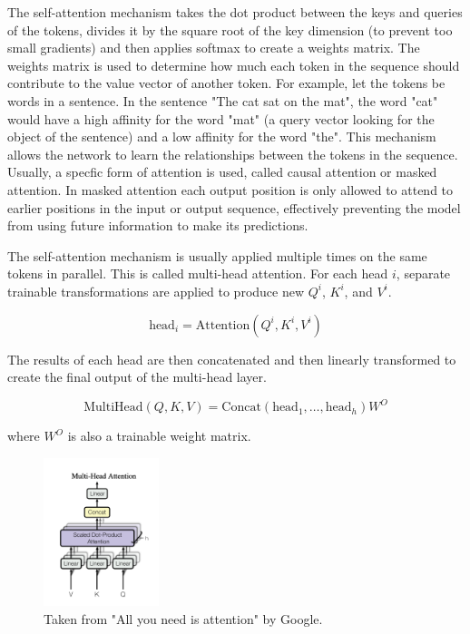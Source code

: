 \documentclass[11pt]{article}
\begin{document}
The self-attention mechanism takes the dot product between the keys and queries of the tokens, divides it by the square root of the key dimension (to prevent too small gradients) and then applies softmax to create a weights matrix. The weights matrix is used to determine how much each token in the sequence should contribute to the value vector of another token. For example, let the tokens be words in a sentence. In the sentence "The cat sat on the mat", the word "cat" would have a high affinity for the word "mat" (a query vector looking for the object of the sentence) and a low affinity for the word "the". This mechanism allows the network to learn the relationships between the tokens in the sequence. Usually, a specfic form of attention is used, called causal attention or masked attention. In masked attention each output position is only allowed to attend to earlier positions in the input or output sequence, effectively preventing the model from using future information to make its predictions.

The self-attention mechanism is usually applied multiple times on the same tokens in parallel. This is called multi-head attention. For each head $i$, separate trainable transformations are applied to produce new $Q^i$, $K^i$, and $V^i$.

$$\text{head}_i = \text{Attention}(Q^i, K^i, V^i)$$

The results of each head are then concatenated and then linearly transformed to create the final output of the multi-head layer.

$$\text{MultiHead}(Q, K, V) = \text{Concat}(\text{head}_1, \ldots, \text{head}_h)W^O$$

where $W^O$ is also a trainable weight matrix.

\begin{figure}[h]
\centering
\includegraphics[width=0.3\textwidth]{multi-head.png}
\caption{Taken from "All you need is attention" by Google.}
\end{figure}
\end{document}
